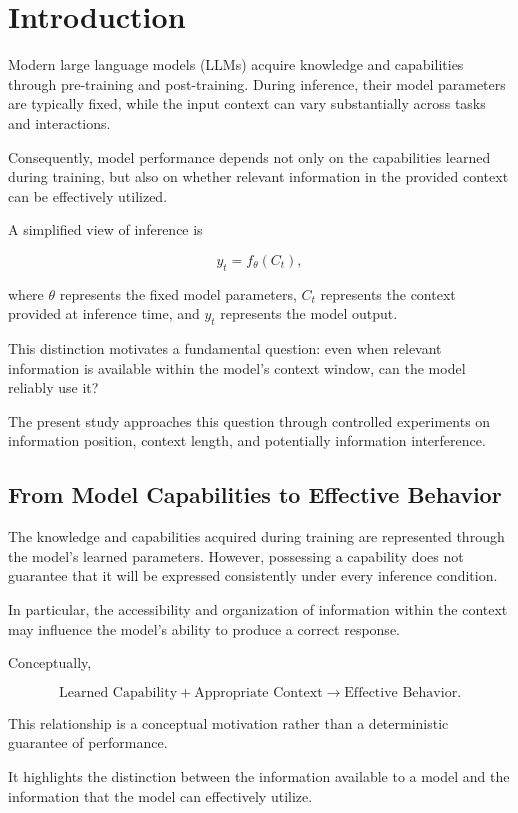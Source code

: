 
\section{Introduction}
\label{sec:introduction}

Modern large language models (LLMs) acquire knowledge and capabilities through
pre-training and post-training. During inference, their model parameters are
typically fixed, while the input context can vary substantially across tasks
and interactions.

Consequently, model performance depends not only on the capabilities learned
during training, but also on whether relevant information in the provided
context can be effectively utilized.

A simplified view of inference is

\[
    y_t = f_{\theta}(C_t),
\]

where $\theta$ represents the fixed model parameters, $C_t$ represents the
context provided at inference time, and $y_t$ represents the model output.

This distinction motivates a fundamental question: even when relevant
information is available within the model's context window, can the model
reliably use it?

The present study approaches this question through controlled experiments on
information position, context length, and potentially information interference.

\subsection{From Model Capabilities to Effective Behavior}

The knowledge and capabilities acquired during training are represented through
the model's learned parameters. However, possessing a capability does not
guarantee that it will be expressed consistently under every inference
condition.

In particular, the accessibility and organization of information within the
context may influence the model's ability to produce a correct response.

Conceptually,

\[
    \text{Learned Capability}
    +
    \text{Appropriate Context}
    \rightarrow
    \text{Effective Behavior}.
\]

This relationship is a conceptual motivation rather than a deterministic
guarantee of performance.

It highlights the distinction between the information available to a model and
the information that the model can effectively utilize.

